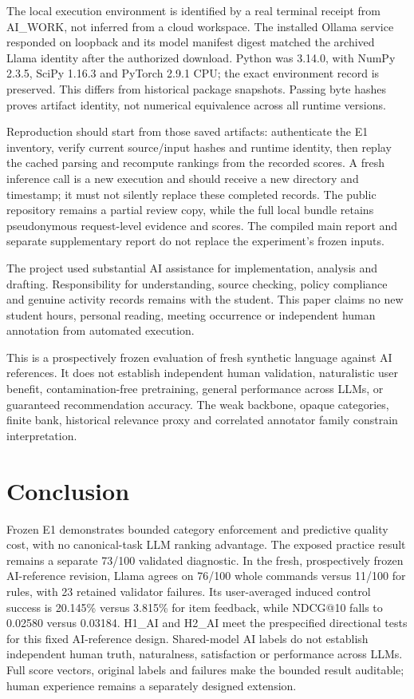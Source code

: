 \documentclass[conference]{IEEEtran}
\begin{document}
The local execution environment is identified by a real terminal receipt from AI\_WORK, not inferred from a cloud workspace. The installed Ollama service responded on loopback and its model manifest digest matched the archived Llama identity after the authorized download. Python was 3.14.0, with NumPy 2.3.5, SciPy 1.16.3 and PyTorch 2.9.1 CPU; the exact environment record is preserved. This differs from historical package snapshots. Passing byte hashes proves artifact identity, not numerical equivalence across all runtime versions.

Reproduction should start from those saved artifacts: authenticate the E1 inventory, verify current source/input hashes and runtime identity, then replay the cached parsing and recompute rankings from the recorded scores. A fresh inference call is a new execution and should receive a new directory and timestamp; it must not silently replace these completed records. The public repository remains a partial review copy, while the full local bundle retains pseudonymous request-level evidence and scores. The compiled main report and separate supplementary report do not replace the experiment's frozen inputs.

The project used substantial AI assistance for implementation, analysis and drafting. Responsibility for understanding, source checking, policy compliance and genuine activity records remains with the student. This paper claims no new student hours, personal reading, meeting occurrence or independent human annotation from automated execution.

This is a prospectively frozen evaluation of fresh synthetic language against AI references. It does not establish independent human validation, naturalistic user benefit, contamination-free pretraining, general performance across LLMs, or guaranteed recommendation accuracy. The weak backbone, opaque categories, finite bank, historical relevance proxy and correlated annotator family constrain interpretation.

\section{Conclusion}
Frozen E1 demonstrates bounded category enforcement and predictive quality cost, with no canonical-task LLM ranking advantage. The exposed practice result remains a separate 73/100 validated diagnostic. In the fresh, prospectively frozen AI-reference revision, Llama agrees on 76/100 whole commands versus 11/100 for rules, with 23 retained validator failures. Its user-averaged induced control success is 20.145\% versus 3.815\% for item feedback, while NDCG@10 falls to 0.02580 versus 0.03184. H1\_AI and H2\_AI meet the prespecified directional tests for this fixed AI-reference design. Shared-model AI labels do not establish independent human truth, naturalness, satisfaction or performance across LLMs. Full score vectors, original labels and failures make the bounded result auditable; human experience remains a separately designed extension.



\end{document}
